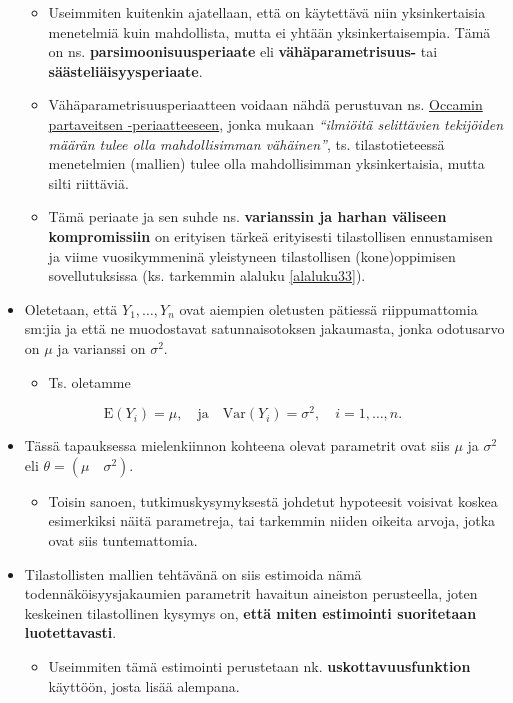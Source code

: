 \documentclass[
]{book}
\providecommand{\tightlist}{%
  \setlength{\itemsep}{0pt}\setlength{\parskip}{0pt}}
\begin{document}
\begin{itemize}
  \begin{itemize}
  \tightlist
  \item
    Useimmiten kuitenkin ajatellaan, että on käytettävä niin yksinkertaisia menetelmiä kuin mahdollista, mutta ei yhtään yksinkertaisempia. Tämä on ns. \textbf{parsimoonisuusperiaate} eli \textbf{vähäparametrisuus-} tai \textbf{säästeliäisyysperiaate}.
  \item
    Vähäparametrisuusperiaatteen voidaan nähdä perustuvan ns. \href{https://fi.wikipedia.org/wiki/Occamin_partaveitsi}{Occamin partaveitsen -periaatteeseen}, jonka mukaan \emph{``ilmiöitä selittävien tekijöiden määrän tulee olla mahdollisimman vähäinen''}, ts. tilastotieteessä menetelmien (mallien) tulee olla mahdollisimman yksinkertaisia, mutta silti riittäviä.
  \item
    Tämä periaate ja sen suhde ns. \textbf{varianssin ja harhan väliseen kompromissiin} on erityisen tärkeä erityisesti tilastollisen ennustamisen ja viime vuosikymmeninä yleistyneen tilastollisen (kone)oppimisen sovellutuksissa (ks. tarkemmin alaluku \ref{alaluku33}).
  \end{itemize}
\item
  Oletetaan, että \(Y_1, \ldots, Y_n\) ovat aiempien oletusten pätiessä riippumattomia sm:jia ja että ne muodostavat satunnaisotoksen jakaumasta, jonka odotusarvo on \(\mu\) ja varianssi on \(\sigma^2\).

  \begin{itemize}
  \tightlist
  \item
    Ts. oletamme
  \end{itemize}
\end{itemize}

\[
\text{E}(Y_i) = \mu,  \quad \text{ja} \quad 
\mathrm{Var}(Y_i) = \sigma^2, \quad i=1,\ldots,n.
\]

\begin{itemize}
\tightlist
\item
  Tässä tapauksessa mielenkiinnon kohteena olevat parametrit ovat siis \(\mu\) ja \(\sigma^2\) eli \(\theta = (\mu \quad \sigma^2)\).

  \begin{itemize}
  \tightlist
  \item
    Toisin sanoen, tutkimuskysymyksestä johdetut hypoteesit voisivat koskea esimerkiksi näitä parametreja, tai tarkemmin niiden oikeita arvoja, jotka ovat siis tuntemattomia.
  \end{itemize}
\item
  Tilastollisten mallien tehtävänä on siis estimoida nämä todennäköisyysjakaumien parametrit havaitun aineiston perusteella, joten keskeinen tilastollinen kysymys on, \textbf{että miten estimointi suoritetaan luotettavasti}.

  \begin{itemize}
  \tightlist
  \item
    Useimmiten tämä estimointi perustetaan nk. \textbf{uskottavuusfunktion} käyttöön, josta lisää alempana.
  \end{itemize}
\end{itemize}
\end{document}
